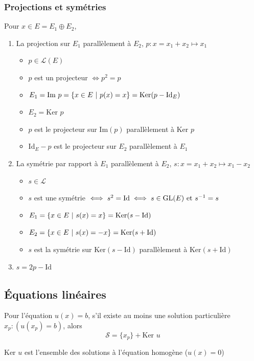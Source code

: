 \documentclass[openany]{book}
\begin{document}
\subsubsection{Projections et symétries}
Pour $x \in E = E_1 \oplus E_2$, 
\begin{enumerate}
    \item  La projection sur $E_1$ parallèlement à $E_2$, $ p : x = x_1 + x_2 \mapsto x_1 $
    \begin{itemize}
        \item $ p \in \mathcal{L}(E) $
        \item $p$ est un projecteur $\iff p^2 = p $
        \item $ E_1 = \text{Im }p = \{x \in E \text{ } | \text{ } p(x) = x \} = \text{Ker}(p - \text{Id}_E) $
        \item $ E_2 = \text{Ker }p$
        \item $p$ est le projecteur sur $\text{Im}(p)$ parallèlement à $\text{Ker }p$ 
        \item $\text{Id}_E - p$ est le projecteur sur $E_2$ parallèlement à $E_1$
    \end{itemize}
    \item La symétrie par rapport à $E_1$ parallèlement à $E_2$, $ s : x = x_1 + x_2 \mapsto x_1 - x_2 $
    \begin{itemize}
        \item $ s \in \mathcal{L} $
        \item $s$ est une symétrie $\iff s^2 = \text{Id} \iff s \in \text{GL}(E) \text{ et } s^{-1}=s$ 
        \item $ E_1 = \{ x \in E \text{ } | \text{ } s(x) = x \} = \text{Ker}(s-\text{Id}) $
        \item $ E_2 = \{ x \in E \text{ } | \text{ } s(x) = -x \} = \text{Ker}(s+\text{Id}) $ 
        \item $s$ est la symétrie sur $\text{Ker}(s-\text{Id})$ parallèlement à $\text{Ker}(s+\text{Id})$
    \end{itemize}
    \item $s = 2p - \text{Id}$
\end{enumerate}

\subsection{Équations linéaires}
Pour l'équation $u(x) = b$, s'il existe au moins une solution particulière $x_p : (u(x_p) = b)$, alors 
\[ \mathcal{S} = \{x_p\} + \text{Ker } u \]

\noindent $\text{Ker }u$ est l'ensemble des solutions à l'équation homogène ($u(x) = 0$)
\end{document}
